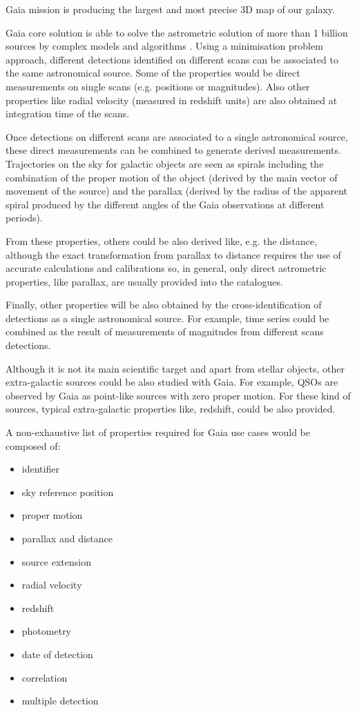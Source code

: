 Gaia mission is producing the largest and most precise 3D map of our galaxy.

Gaia core solution is able to solve the astrometric solution of more than 1
billion sources by complex models and algorithms \citep{2012A&A...538A..78L}.
Using a minimisation problem approach, different detections identified on
different scans can be associated to the same astronomical source. Some of the
properties would be direct measurements on single scans (e.g. positions or
magnitudes). Also other properties like radial velocity (measured in redshift
units) are also obtained at integration time of the scans.

Once detections on different scans are associated to a single astronomical
source, these direct measurements can be combined to generate derived
measurements. Trajectories on the sky for galactic objects are seen as
spirals including the combination of the proper motion of the object
(derived by the main vector of movement of the source) and the parallax
(derived by the radius of the apparent spiral produced by the different
angles of the Gaia observations at different periods).

From these properties, others could be also derived like, e.g. the distance,
although the exact transformation from parallax to distance requires the use of
accurate calculations and calibrations so, in general, only direct astrometric
properties, like parallax, are usually provided into the catalogues.

Finally, other properties will be also obtained by the cross-identification of
detections as a single astronomical source. For example, time series could be
combined as the result of measurements of magnitudes from different scans
detections.

Although it is not its main scientific target and apart from stellar objects,
other extra-galactic sources could be also studied with Gaia. For example, QSOs
are observed by Gaia as point-like sources with zero proper motion. For these
kind of sources, typical extra-galactic properties like, redshift, could be also
provided.

A non-exhaustive list of properties required for Gaia use cases would be composed
of:

\begin{itemize}
    \item identifier
    \item sky reference position
    \item proper motion
    \item parallax and distance

    \item source extension
    \item radial velocity
    \item redshift
    \item photometry
    \item date of detection
    \item correlation
    \item multiple detection
\end{itemize}